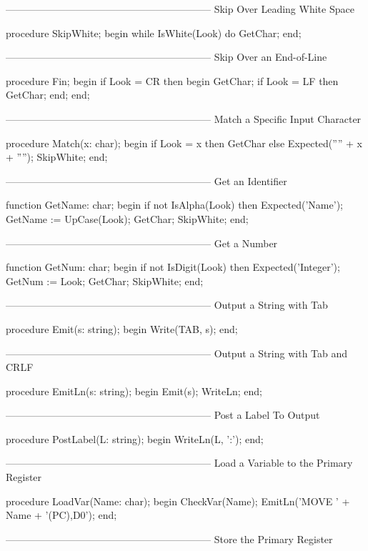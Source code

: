 \documentclass[float=false, crop=false]{standalone}
\begin{document}
\begin{code}
{--------------------------------------------------------------}
{ Skip Over Leading White Space }

procedure SkipWhite;
begin
   while IsWhite(Look) do
      GetChar;
end;


{--------------------------------------------------------------}
{ Skip Over an End-of-Line }

procedure Fin;
begin
   if Look = CR then begin
      GetChar;
      if Look = LF then
         GetChar;
   end;
end;


{--------------------------------------------------------------}
{ Match a Specific Input Character }

procedure Match(x: char);
begin
   if Look = x then GetChar
     else Expected('''' + x + '''');
     SkipWhite;
end;


{--------------------------------------------------------------}
{ Get an Identifier }

function GetName: char;
begin
   if not IsAlpha(Look) then Expected('Name');
   GetName := UpCase(Look);
     GetChar;
     SkipWhite;
end;


{--------------------------------------------------------------}
{ Get a Number }

function GetNum: char;
begin
   if not IsDigit(Look) then Expected('Integer');
   GetNum := Look;
     GetChar;
     SkipWhite;
end;


{--------------------------------------------------------------}
{ Output a String with Tab }

procedure Emit(s: string);
begin
   Write(TAB, s);
end;


{--------------------------------------------------------------}
{ Output a String with Tab and CRLF }

procedure EmitLn(s: string);
begin
   Emit(s);
   WriteLn;
end;


{--------------------------------------------------------------}
{ Post a Label To Output }

procedure PostLabel(L: string);
begin
   WriteLn(L, ':');
end;


{--------------------------------------------------------------}
{ Load a Variable to the Primary Register }

procedure LoadVar(Name: char);
begin
     CheckVar(Name);
     EmitLn('MOVE ' + Name + '(PC),D0');
end;


{--------------------------------------------------------------}
{ Store the Primary Register }


\end{code}
\end{document}
